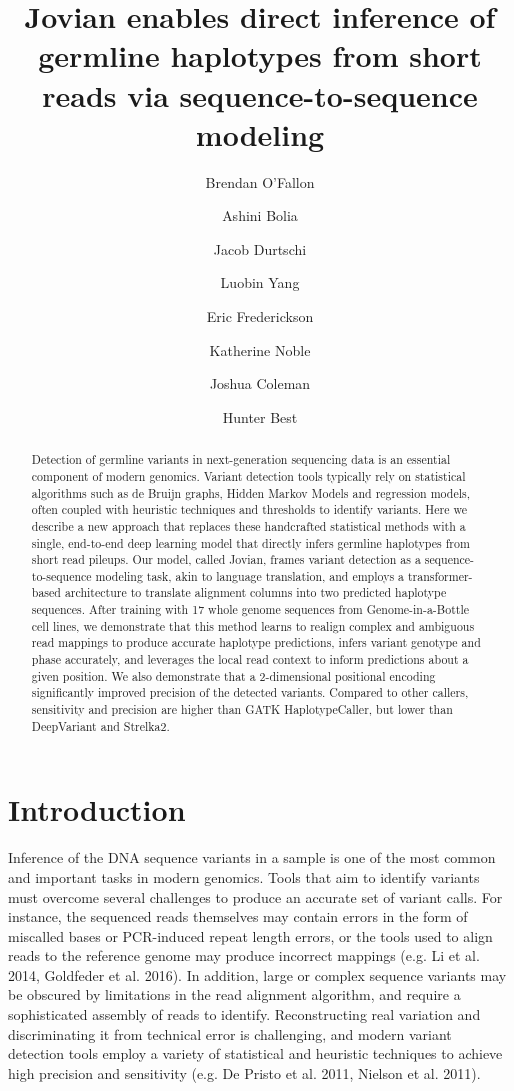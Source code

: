 \documentclass[]{article}
\title{Jovian enables direct inference of germline haplotypes from short reads via sequence-to-sequence modeling}
\author[1]{Brendan O'Fallon}
\author[1]{Ashini Bolia}
\author[1]{Jacob Durtschi}
\author[1]{Luobin Yang}
\author[1]{Eric Frederickson}
\author[1]{Katherine Noble}
\author[1]{Joshua Coleman}
\author[1]{Hunter Best}
\affil[1]{ARUP Institute for Clinical and Experimental Pathology, Salt Lake City, UT}
\date{}
\begin{document}
\maketitle

\begin{abstract}
	Detection of germline variants in next-generation sequencing data is an essential component of modern genomics. Variant detection tools typically rely on statistical algorithms such as de Bruijn graphs, Hidden Markov Models and regression models, often coupled with heuristic techniques and thresholds to identify variants. Here we describe a new approach that replaces these handcrafted statistical methods with a single, end-to-end deep learning model that directly infers germline haplotypes from short read pileups. Our model, called Jovian, frames variant detection as a sequence-to-sequence modeling task, akin to language translation, and employs a transformer-based architecture to translate alignment columns into two predicted haplotype sequences. After training with 17 whole genome sequences from Genome-in-a-Bottle cell lines, we demonstrate that this method learns to realign complex and ambiguous read mappings to produce accurate haplotype predictions, infers variant genotype and phase accurately, and leverages the local read context to inform predictions about a given position. We also demonstrate that a 2-dimensional positional encoding significantly improved precision of the detected variants. Compared to other callers, sensitivity and precision are higher than GATK HaplotypeCaller, but lower than DeepVariant and Strelka2. 
\end{abstract}


\section{Introduction}

Inference of the DNA sequence variants in a sample is one of the most common and important tasks in modern genomics. Tools that aim to identify variants must overcome several challenges to produce an accurate set of variant calls. For instance, the sequenced reads themselves may contain errors in the form of miscalled bases or PCR-induced repeat length errors, or the tools used to align reads to the reference genome may produce incorrect mappings (e.g. Li et al. 2014, Goldfeder et al. 2016).  In addition, large or complex sequence variants may be obscured by limitations in the read alignment algorithm, and require a sophisticated assembly of reads to identify. Reconstructing real variation and discriminating it from technical error is challenging, and modern variant detection tools employ a variety of statistical and heuristic techniques to achieve high precision and sensitivity (e.g. De Pristo et al. 2011, Nielson et al. 2011). 
\end{document}
